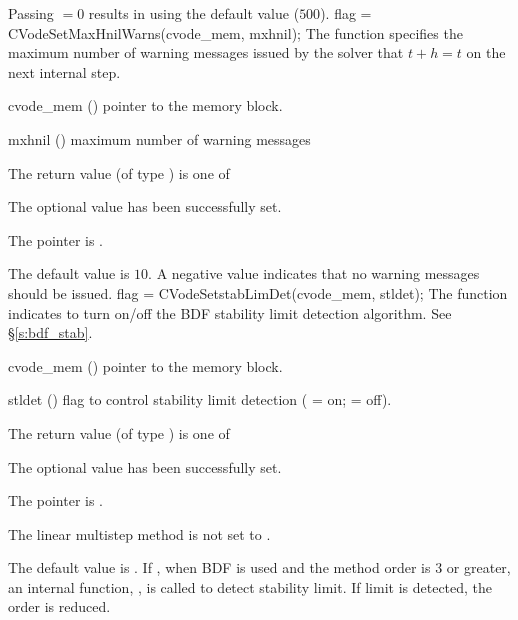 {
  Passing $=0$ results in {\cvode} using the default value ($500$).
}
{
flag = CVodeSetMaxHnilWarns(cvode\_mem, mxhnil);
}
{
  The function  specifies the maximum number of warning
  messages issued by the solver that $t+h=t$ on the next internal step.
}
{
  \begin{args}
  \item[cvode\_mem] ()
    pointer to the {\cvode} memory block.
  \item[mxhnil] ()
    maximum number of warning messages
  \end{args}
}
{
  The return value  (of type ) is one of
  \begin{args}
  \item[\Id{CV\_SUCCESS}] 
    The optional value has been successfully set.
  \item[\Id{CV\_MEM\_NULL}]
    The  pointer is .
  \end{args}
}
{
  The default value is $10$.
  A negative  value indicates that no warning messages should
  be issued.
}
{
flag = CVodeSetstabLimDet(cvode\_mem, stldet);
}
{
  The function  indicates to turn on/off
  the BDF stability limit detection algorithm. See \S\ref{s:bdf_stab}.
}
{
  \begin{args}
  \item[cvode\_mem] ()
    pointer to the {\cvode} memory block.
  \item[stldet] ()
    flag to control stability limit detection ( = on;  = off).
  \end{args}
}
{
  The return value  (of type ) is one of
  \begin{args}
  \item[\Id{CV\_SUCCESS}] 
    The optional value has been successfully set.
  \item[\Id{CV\_MEM\_NULL}]
    The  pointer is .
  \item[\Id{CV\_ILL\_INPUT}]
    The linear multistep method is not set to .
  \end{args}
}
{
  The default value is . If , when BDF is used
  and the method order is 3 or greater, an internal function, ,
  is called to detect stability limit. If limit is detected, the order is reduced.
}
